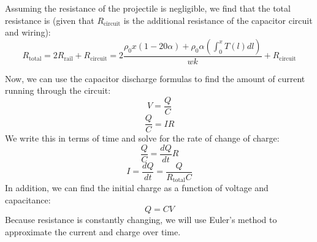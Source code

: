 \documentclass[12pt]{article}
\begin{document}
Assuming the resistance of the projectile is negligible, we find that the total resistance is (given that $R_{\text{circuit}}$ is the additional resistance of the capacitor circuit and wiring):
\begin{equation}
R_{\text{total}} = 2R_{\text{rail}} + R_{\text{circuit}} = 2\frac{\rho_{0}x(1 - 20\alpha) + \rho_{0}\alpha (\int_{0}^{x} T(l) dl)}{wk} + R_{\text{circuit}}
\label{eqn:eqn3}
\end{equation}

Now, we can use the capacitor discharge formulas to find the amount of current running through the circuit:
\begin{equation}
    V = \frac{Q}{C}
\end{equation}
\begin{equation}
    \frac{Q}{C} = IR
\end{equation}
We write this in terms of time and solve for the rate of change of charge:
\begin{equation}
    \frac{Q}{C} = \frac{dQ}{dt} R
\end{equation}
\begin{equation}
    I = \frac{dQ}{dt} = \frac{Q}{R_{\text{total}}C}
    \label{eqn:eqn4}
\end{equation}
In addition, we can find the initial charge as a function of voltage and capacitance:
\begin{equation}
    Q = CV
    \label{eqn:eqn5}
\end{equation}
Because resistance is constantly changing, we will use Euler's method to approximate the current and charge over time.
\end{document}
